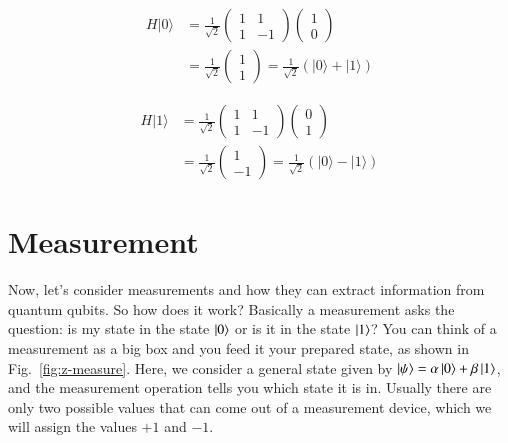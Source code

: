 \begin{equation}
\begin{aligned}
H|0\rangle &=\frac{1}{\sqrt{2}}\left(\begin{array}{cc}
1 & 1 \\
1 & -1
\end{array}\right)\left(\begin{array}{l}
1 \\
0
\end{array}\right) \\
&=\frac{1}{\sqrt{2}}\left(\begin{array}{l}
1 \\
1
\end{array}\right)=\frac{1}{\sqrt{2}}(|0\rangle+|1\rangle)
\end{aligned}
\end{equation}

\begin{equation}
\begin{aligned}
H|1\rangle &=\frac{1}{\sqrt{2}}\left(\begin{array}{cc}
1 & 1 \\
1 & -1
\end{array}\right)\left(\begin{array}{l}
0 \\
1
\end{array}\right) \\
&=\frac{1}{\sqrt{2}}\left(\begin{array}{c}
1 \\
-1
\end{array}\right)=\frac{1}{\sqrt{2}}(|0\rangle-|1\rangle)
\end{aligned}
\end{equation}


\section{Measurement}
\label{sec:measurement}

Now, let's consider measurements and how they can extract information from quantum qubits. So how does it work? Basically a measurement asks the question: is my state in the state $\left| 0 \right\rangle$ or is it in the state $\left| 1 \right\rangle$? You can think of a measurement as a big box and you feed it your prepared state, as shown in Fig.~\ref{fig:z-measure}. Here, we consider a general state given by $\left| \psi \right\rangle = \alpha\left| 0 \right\rangle+\beta\left| 1 \right\rangle$, and the measurement operation tells you which state it is in. Usually there are only two possible values that can come out of a measurement device, which we will assign the values $+1$ and $-1$.

